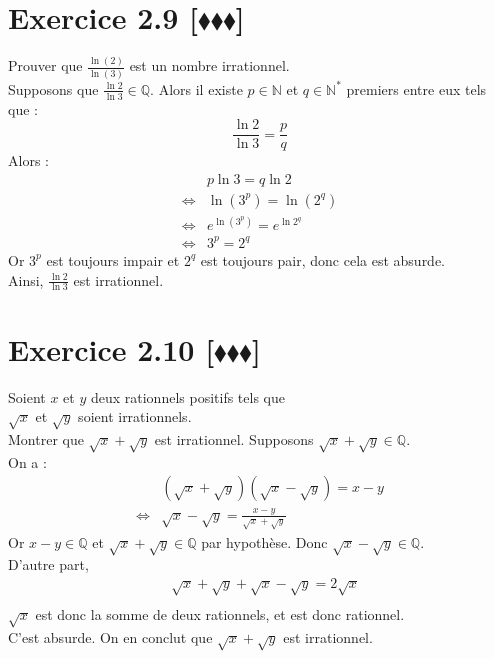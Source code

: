 \documentclass[10pt]{article}
\begin{document}
\section*{Exercice 2.9 [$\blacklozenge\blacklozenge\blacklozenge$]}
\begin{tcolorbox}[enhanced, width=6in, center, size=fbox, fontupper=\large, drop shadow southwest]
    Prouver que $\frac{\ln(2)}{\ln(3)}$ est un nombre irrationnel.\\
    Supposons que $\frac{\ln{2}}{\ln{3}}\in\mathbb{Q}$. Alors il existe $p\in\mathbb{N}$ et $q\in\mathbb{N}^*$ premiers entre eux tels que :
    \begin{equation*}
        \frac{\ln{2}}{\ln{3}}=\frac{p}{q}
    \end{equation*}
    Alors :
    \begin{align*}
        &p\ln{3}=q\ln{2}\\
        \iff&\ln(3^p)=\ln(2^q)\\
        \iff&e^{\ln(3^p)}=e^{\ln{2^q}}\\
        \iff&3^p=2^q
    \end{align*}
    Or $3^p$ est toujours impair et $2^q$ est toujours pair, donc cela est absurde.\\
    Ainsi, $\frac{\ln2}{\ln3}$ est irrationnel.
\end{tcolorbox}

\section*{Exercice 2.10 [$\blacklozenge\blacklozenge\blacklozenge$]}
\begin{tcolorbox}[enhanced, width=6in, center, size=fbox, fontupper=\large, drop shadow southwest]
    Soient $x$ et $y$ deux rationnels positifs tels que \\$\sqrt{x}$ et $\sqrt{y}$ soient irrationnels.\\
    Montrer que $\sqrt{x} + \sqrt{y}$ est irrationnel.
    Supposons $\sqrt{x}+\sqrt{y}\in\mathbb{Q}$.\\
    On a :
    \begin{align*}
        &(\sqrt{x}+\sqrt{y})(\sqrt{x}-\sqrt{y})=x-y\\
        \iff&\sqrt{x}-\sqrt{y}=\frac{x-y}{\sqrt{x}+\sqrt{y}}
    \end{align*}
    Or $x-y\in\mathbb{Q}$ et $\sqrt{x}+\sqrt{y}\in\mathbb{Q}$ par hypothèse. Donc $\sqrt{x}-\sqrt{y}\in\mathbb{Q}$.\\
    D'autre part,
    \begin{align*}
        &\sqrt{x}+\sqrt{y}+\sqrt{x}-\sqrt{y}=2\sqrt{x}\\
    \end{align*}
    $\sqrt{x}$ est donc la somme de deux rationnels, et est donc rationnel.\\
    C'est absurde. On en conclut que $\sqrt{x}+\sqrt{y}$ est irrationnel.
\end{tcolorbox}
\end{document}
